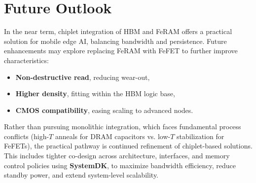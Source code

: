 \section{Future Outlook}
In the near term, chiplet integration of HBM and FeRAM offers a practical solution for mobile edge AI, 
balancing bandwidth and persistence. 
Future enhancements may explore replacing FeRAM with FeFET to further improve characteristics:
\begin{itemize}
  \item \textbf{Non-destructive read}, reducing wear-out,
  \item \textbf{Higher density}, fitting within the HBM logic base,
  \item \textbf{CMOS compatibility}, easing scaling to advanced nodes.
\end{itemize}

Rather than pursuing monolithic integration, which faces fundamental process conflicts 
(high-$T$ anneals for DRAM capacitors vs. low-$T$ stabilization for FeFETs), 
the practical pathway is continued refinement of chiplet-based solutions. 
This includes tighter co-design across architecture, interfaces, and memory control policies using \textbf{SystemDK}, 
to maximize bandwidth efficiency, reduce standby power, and extend system-level scalability.

